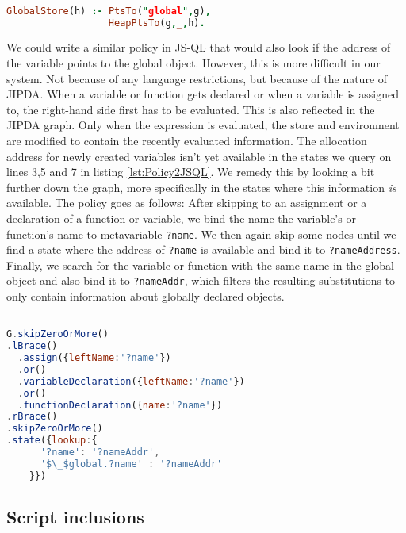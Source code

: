 \begin{lstlisting}[label={lst:Policy2GK},language=Prolog,caption=Policy 2 in GateKeeper,mathescape=true]  % float=t?

GlobalStore(h) :- PtsTo("global",g),
                  HeapPtsTo(g,_,h).
\end{lstlisting}

We could write a similar policy in JS-QL that would also look if the address of the variable points to the global object. However, this is more difficult in our system. Not because of any language restrictions, but because of the nature of JIPDA. When a variable or function gets declared or when a variable is assigned to, the right-hand side first has to be evaluated. This is also reflected in the JIPDA graph. Only when the expression is evaluated, the store and environment are modified to contain the recently evaluated information. The allocation address for newly created variables isn't yet available in the states we query on lines 3,5 and 7 in listing \ref{lst:Policy2JSQL}. We remedy this by looking a bit further down the graph, more specifically in the states where this information \textit{is} available. The policy goes as follows: After skipping to an assignment or a declaration of a function or variable, we bind the name the variable's or function's name to metavariable \texttt{?name}. We then again skip some nodes until we find a state where the address of \texttt{?name} is available and bind it to \texttt{?nameAddress}. Finally, we search for the variable or function with the same name in the global object and also bind it to \texttt{?nameAddr}, which filters the resulting substitutions to only contain information about globally declared objects.

\begin{lstlisting}[label={lst:Policy2JSQL},language=JavaScript,caption=Policy 2 in JS-QL,mathescape=true]  % float=t?

G.skipZeroOrMore()
.lBrace()
  .assign({leftName:'?name'})
  .or()
  .variableDeclaration({leftName:'?name'})
  .or()
  .functionDeclaration({name:'?name'})
.rBrace()
.skipZeroOrMore()
.state({lookup:{
      '?name': '?nameAddr',
      '$\_$global.?name' : '?nameAddr'
    }})
\end{lstlisting}

\subsection{Script inclusions}
\label{subsec:ScriptInclusion}

